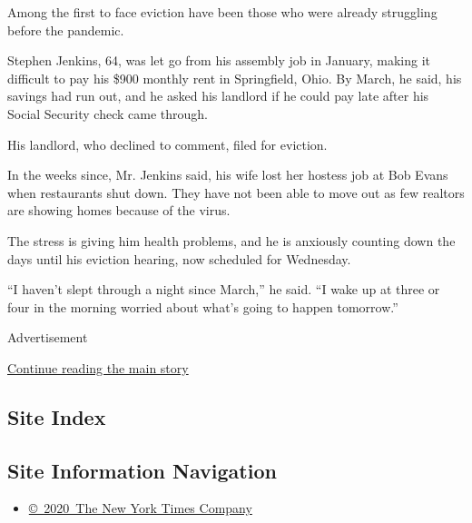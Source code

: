 Among the first to face eviction have been those who were already
struggling before the pandemic.

Stephen Jenkins, 64, was let go from his assembly job in January, making
it difficult to pay his \$900 monthly rent in Springfield, Ohio. By
March, he said, his savings had run out, and he asked his landlord if he
could pay late after his Social Security check came through.

His landlord, who declined to comment, filed for eviction.

In the weeks since, Mr. Jenkins said, his wife lost her hostess job at
Bob Evans when restaurants shut down. They have not been able to move
out as few realtors are showing homes because of the virus.

The stress is giving him health problems, and he is anxiously counting
down the days until his eviction hearing, now scheduled for Wednesday.

``I haven't slept through a night since March,'' he said. ``I wake up at
three or four in the morning worried about what's going to happen
tomorrow.''

Advertisement

\protect\hyperlink{after-bottom}{Continue reading the main story}

\hypertarget{site-index}{%
\subsection{Site Index}\label{site-index}}

\hypertarget{site-information-navigation}{%
\subsection{Site Information
Navigation}\label{site-information-navigation}}

\begin{itemize}
\tightlist
\item
  \href{https://help.nytimes3xbfgragh.onion/hc/en-us/articles/115014792127-Copyright-notice}{©~2020~The
  New York Times Company}
\end{itemize}

